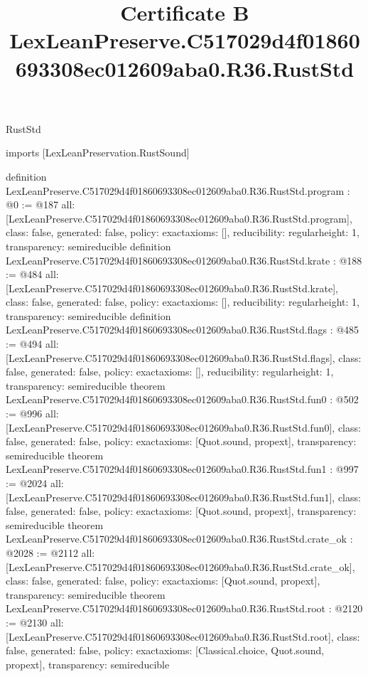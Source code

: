 \begin{lexlean}{RustStd}
\title{Certificate B LexLeanPreserve.C517029d4f01860693308ec012609aba0.R36.RustStd}
\begin{coremodule}
imports [LexLeanPreservation.RustSound]

definition LexLeanPreserve.C517029d4f01860693308ec012609aba0.R36.RustStd.program : @0 := @187 {
  all: [LexLeanPreserve.C517029d4f01860693308ec012609aba0.R36.RustStd.program],
  class: false,
  generated: false,
  policy: exact{axioms: []},
  reducibility: regular{height: 1},
  transparency: semireducible
}
definition LexLeanPreserve.C517029d4f01860693308ec012609aba0.R36.RustStd.krate : @188 := @484 {
  all: [LexLeanPreserve.C517029d4f01860693308ec012609aba0.R36.RustStd.krate],
  class: false,
  generated: false,
  policy: exact{axioms: []},
  reducibility: regular{height: 1},
  transparency: semireducible
}
definition LexLeanPreserve.C517029d4f01860693308ec012609aba0.R36.RustStd.flags : @485 := @494 {
  all: [LexLeanPreserve.C517029d4f01860693308ec012609aba0.R36.RustStd.flags],
  class: false,
  generated: false,
  policy: exact{axioms: []},
  reducibility: regular{height: 1},
  transparency: semireducible
}
theorem LexLeanPreserve.C517029d4f01860693308ec012609aba0.R36.RustStd.fun0 : @502 := @996 {
  all: [LexLeanPreserve.C517029d4f01860693308ec012609aba0.R36.RustStd.fun0],
  class: false,
  generated: false,
  policy: exact{axioms: [Quot.sound, propext]},
  transparency: semireducible
}
theorem LexLeanPreserve.C517029d4f01860693308ec012609aba0.R36.RustStd.fun1 : @997 := @2024 {
  all: [LexLeanPreserve.C517029d4f01860693308ec012609aba0.R36.RustStd.fun1],
  class: false,
  generated: false,
  policy: exact{axioms: [Quot.sound, propext]},
  transparency: semireducible
}
theorem LexLeanPreserve.C517029d4f01860693308ec012609aba0.R36.RustStd.crate_ok : @2028 := @2112 {
  all: [LexLeanPreserve.C517029d4f01860693308ec012609aba0.R36.RustStd.crate_ok],
  class: false,
  generated: false,
  policy: exact{axioms: [Quot.sound, propext]},
  transparency: semireducible
}
theorem LexLeanPreserve.C517029d4f01860693308ec012609aba0.R36.RustStd.root : @2120 := @2130 {
  all: [LexLeanPreserve.C517029d4f01860693308ec012609aba0.R36.RustStd.root],
  class: false,
  generated: false,
  policy: exact{axioms: [Classical.choice, Quot.sound, propext]},
  transparency: semireducible
}


\end{coremodule}
\end{lexlean}
